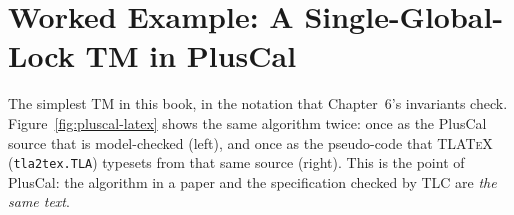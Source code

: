 \section{Worked Example: A Single-Global-Lock TM in PlusCal}
\label{sec:pluscal-example}

The simplest TM in this book, in the notation that Chapter~6's invariants
check.  Figure~\ref{fig:pluscal-latex} shows the same algorithm twice:
once as the PlusCal source that is model-checked (left), and once as the
pseudo-code that \textsc{TLATeX} (\texttt{tla2tex.TLA}) typesets from that
same source (right).  This is the point of PlusCal: the algorithm in a
paper and the specification checked by TLC are \emph{the same text}.

